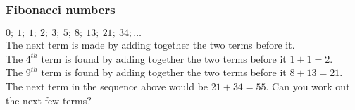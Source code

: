 \subsubsection*{Fibonacci numbers}
$0;~1;~1;~2;~3;~5;~8;~13;~21;~34;\ldots$\\
The next term is made by adding together the two terms before it.\\
The $4^{th}$ term is found by adding together the two terms before it $1+1=2$.\\
The $9^{th}$ term is found by adding together the two terms before it $8+13=21$.\\
The next term in the sequence above would be $21+34=55$.
Can you work out the next few terms?



